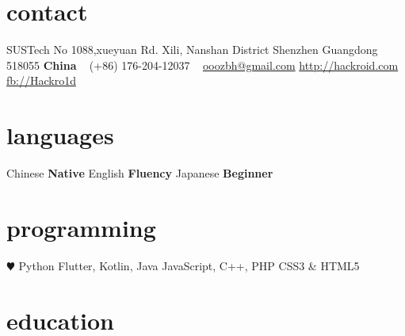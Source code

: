 \documentclass[]{friggeri-cv-a4}
\begin{document}


\begin{aside} %
\section{contact}
SUSTech
No 1088,xueyuan Rd.
Xili, Nanshan District
Shenzhen
Guangdong
518055
\textbf{China}
~
(+86) 176-204-12037
~
\href{mailto:ooozbh@gmail.com}{ooozbh@gmail.com}
\href{http://hackroid.com}{http://hackroid.com}
\href{http://www.facebook.com/Hackro1d}{fb://Hackro1d}
\section{languages}
Chinese \textbf{Native}
English \textbf{Fluency}
Japanese \textbf{Beginner}
\section{programming}
{\color{red} $\varheart$} Python
Flutter, Kotlin, Java
JavaScript, C++, PHP
CSS3 \& HTML5
\end{aside}


\section{education}
\end{document}
